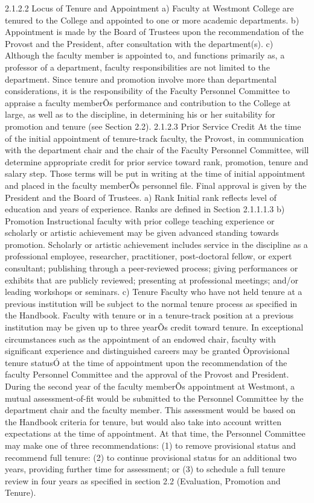 \documentclass[letterpaper, 11pt]{article}
\begin{document}
	2.1.2.2 Locus of Tenure and Appointment
	a) Faculty at Westmont College are tenured to the College and appointed to one or more academic departments.
	b) Appointment is made by the Board of Trustees upon the recommendation of the Provost and the President, after consultation with the department(s).
	c) Although the faculty member is appointed to, and functions primarily as, a professor of a department, faculty responsibilities are not limited to the department.  Since tenure and promotion involve more than departmental considerations, it is the responsibility of the Faculty Personnel Committee to appraise a faculty memberÕs performance and contribution to the College at large, as well as to the discipline, in determining his or her suitability for promotion and tenure (see Section 2.2).
	2.1.2.3 Prior Service Credit
	At the time of the initial appointment of tenure-track faculty, the Provost, in communication with the department chair and the chair of the Faculty Personnel Committee, will determine appropriate credit for prior service toward rank, promotion, tenure and salary step.  Those terms will be put in writing at the time of initial appointment and placed in the faculty memberÕs personnel file.  Final approval is given by the President and the Board of Trustees.
	a) Rank Initial rank reflects level of education and years of experience.  Ranks are defined in Section 2.1.1.1.3
	b) Promotion Instructional faculty with prior college teaching experience or scholarly or artistic achievement may be given advanced standing towards promotion.  Scholarly or artistic achievement includes service in the discipline as a professional employee, researcher, practitioner, post-doctoral fellow, or expert consultant; publishing through a peer-reviewed process; giving performances or exhibits that are publicly reviewed; presenting at professional meetings; and/or leading workshops or seminars.
	c) Tenure Faculty who have not held tenure at a previous institution will be subject to the normal tenure process as specified in the Handbook.  Faculty with tenure or in a tenure-track position at a previous institution may be given up to three yearÕs credit toward tenure.
	In exceptional circumstances such as the appointment of an endowed chair, faculty with significant experience and distinguished careers may be granted Òprovisional tenure statusÓ at the time of appointment upon the recommendation of the faculty Personnel Committee and the approval of the Provost and President.  During the second year of the faculty memberÕs appointment at Westmont, a mutual assessment-of-fit would be submitted to the Personnel Committee by the department chair and the faculty member.  This assessment would be based on the Handbook criteria for tenure, but would also take into account written expectations at the time of appointment.  At that time, the Personnel Committee may make one of three recommendations: (1) to remove provisional status and recommend full tenure: (2) to continue provisional status for an additional two years, providing further time for assessment; or (3) to schedule a full tenure review in four years as specified in section 2.2 (Evaluation, Promotion and Tenure).
\end{document}

